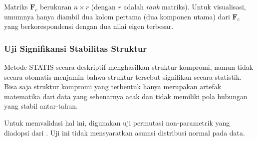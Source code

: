 \documentclass[a4paper]{article}
\theoremstyle{definition} %
\begin{document}
Matriks $\mathbf{F}_c$ berukuran $n \times r$ (dengan $r$ adalah \textit{rank} matriks). Untuk visualisasi, umumnya hanya diambil dua kolom pertama (dua komponen utama) dari $\mathbf{F}_c$ yang berkorespondensi dengan dua nilai eigen terbesar.

\subsubsection{Uji Signifikansi Stabilitas Struktur}

Metode STATIS secara deskriptif menghasilkan struktur kompromi, namun tidak secara otomatis menjamin bahwa struktur tersebut signifikan secara statistik. Bisa saja struktur kompromi yang terbentuk hanya merupakan artefak matematika dari data yang sebenarnya acak dan tidak memiliki pola hubungan yang stabil antar-tahun.

Untuk memvalidasi hal ini, digunakan uji permutasi non-parametrik yang diadopsi dari \cite{kazi1995}. Uji ini tidak mensyaratkan asumsi distribusi normal pada data.
\end{document}
